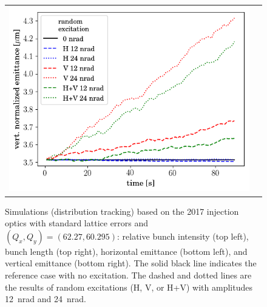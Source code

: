 \documentclass[aps
,prstab
,reprint
,longbibliography
,preprintnumbers
,showkeys
,amsfonts,amssymb,amsmath
,floatfix
]{revtex4-1}
\newlength{\halfwidth}
\begin{document}
\begin{figure}
\begin{tabular}{cc}
    \includegraphics[width=\halfwidth]{2017injerra2b2u_ranadt_3_5um_emit2.png}\\
  \end{tabular}
  \caption{Simulations (distribution tracking) based on the 2017
    injection optics with standard lattice errors and
    $(Q_x, Q_y) = (62.27, 60.295)$: relative bunch intensity (top
    left), bunch length (top right), horizontal emittance (bottom
    left), and vertical emittance (bottom right). The solid black line
    indicates the reference case with no excitation. The dashed and
    dotted lines are the results of random excitations (H, V, or H+V)
    with amplitudes 12~nrad and 24~nrad.}
  \label{fig:ransim}
\end{figure}
\end{document}
